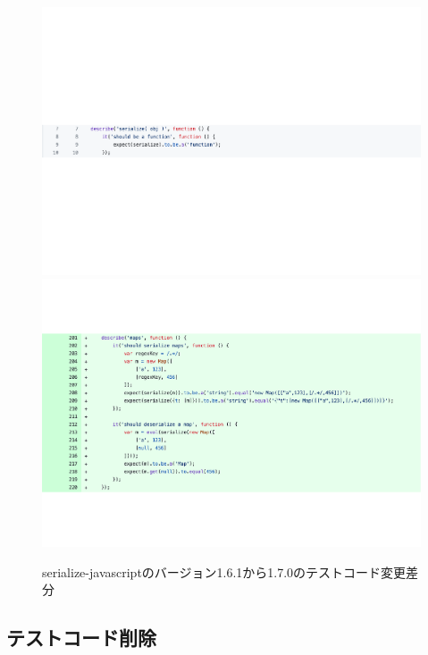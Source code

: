 \documentclass[11pt,dvipdfmx]{jreport}
\begin{document}
\begin{figure}[t]
  \centering
  \includegraphics[width=1.0\linewidth]{fig/rq1/set-map/map.test.1.pdf}
  \includegraphics[width=1.0\linewidth]{fig/rq1/set-map/map.test.2.pdf}
  \caption{serialize-javascriptのバージョン1.6.1から1.7.0のテストコード変更差分}
  \label{fig:rq1.insert-test-test}
\end{figure}

\subsection{テストコード削除}\label{subsec:delete-test}
\end{document}
